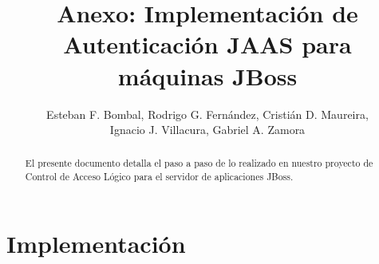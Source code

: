 \documentclass[letterpaper,12pt]{article}
\title{Anexo: Implementación de Autenticación JAAS para máquinas JBoss}
\author{
Esteban F. Bombal,
Rodrigo G. Fernández,
Cristián D. Maureira,\\
Ignacio J. Villacura,
Gabriel A. Zamora
}
\begin{document}

\pagestyle{empty}

\maketitle\thispagestyle{empty}

\begin{abstract}
El presente documento detalla el paso a paso de lo realizado en nuestro proyecto de Control de Acceso Lógico para el
servidor de aplicaciones JBoss.
\end{abstract}

\newpage
\section{Implementación}
\label{sec:implementacion}

\end{document}
